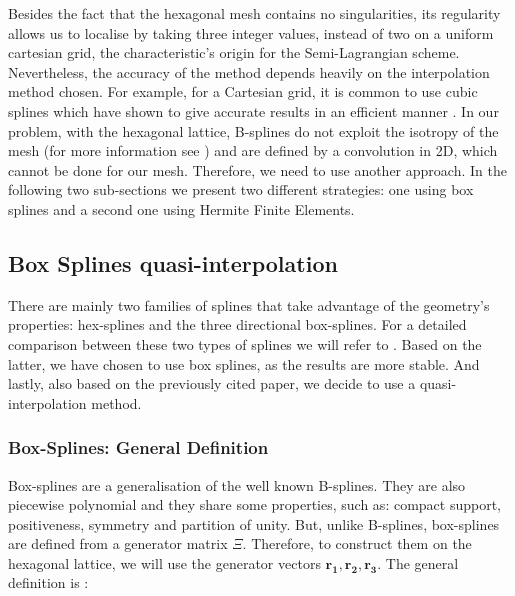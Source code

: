 \documentclass[proc]{edpsmath}
\begin{document}
Besides the fact that the hexagonal mesh contains no singularities, its regularity allows us to localise by taking three integer values, instead of two on a uniform cartesian grid, the characteristic's origin for the Semi-Lagrangian scheme. Nevertheless, the accuracy of the method depends heavily on the interpolation method chosen. For example, for a Cartesian grid, it is common to use cubic splines which have shown to give accurate results in an efficient manner \cite{Sonnendrucker1999201}. In our problem, with the hexagonal lattice, B-splines do not exploit the isotropy of the mesh (for more information see \cite{Mersereau79-IEEE}) and are defined by a convolution in 2D, which cannot be done for our mesh. Therefore, we need to use another approach. In the following two sub-sections we present two different strategies: one using box splines and a second one using Hermite Finite Elements.


\subsection{Box Splines quasi-interpolation}

There are mainly two families of  splines that take advantage of the geometry's properties: hex-splines and the three directional box-splines. For a detailed comparison between these two types of splines we will refer to \cite{Condat2007}. Based on the latter, we have chosen to use box splines, as the results are more stable. And lastly, also based on the previously cited paper, we decide to use a quasi-interpolation method.

\subsubsection{Box-Splines: General Definition}

Box-splines are a generalisation of the well known B-splines. They are also piecewise polynomial and they share some properties, such as: compact support, positiveness, symmetry and partition of unity. But, unlike B-splines, box-splines are defined from a generator matrix $\Xi$. Therefore, to construct them on the hexagonal lattice, we will use the generator vectors $\mathbf{r_1, r_2, r_3}$. The general definition is \cite{Boor1993, Condat2006}:
\end{document}
